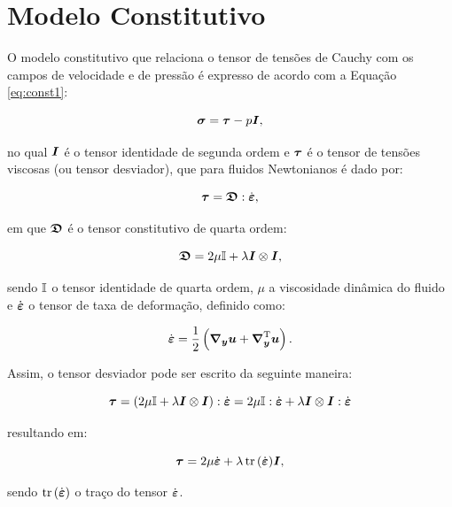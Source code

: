 \section{Modelo Constitutivo} \label{MC}

O modelo constitutivo que relaciona o tensor de tensões de Cauchy com os campos de velocidade e de pressão é expresso de acordo com a Equação \eqref{eq:const1}:

\begin{equation}
    \boldsymbol{\sigma}=\boldsymbol{\tau}-p\boldsymbol{I}\text{,}\label{eq:const1}
\end{equation}

\noindent no qual $\boldsymbol{I}$ é o tensor identidade de segunda ordem e $\boldsymbol{\tau}$ é o tensor de tensões viscosas (ou tensor desviador), que para fluidos Newtonianos é dado por:

\begin{equation}
    \boldsymbol{\tau}=\boldsymbol{\mathfrak{D}}:\dot{\boldsymbol{\varepsilon}}\text{,}
\end{equation}

\noindent em que $\boldsymbol{\mathfrak{D}}$ é o tensor constitutivo de quarta ordem:

\begin{equation}
    \boldsymbol{\mathfrak{D}}=2\mu\boldsymbol{\mathbb{I}}+\lambda\boldsymbol{I}\otimes\boldsymbol{I}\text{,}
\end{equation}

\noindent sendo $\boldsymbol{\mathbb{I}}$ o tensor identidade de quarta ordem, $\mu$ a viscosidade dinâmica do fluido e $\dot{\boldsymbol{\varepsilon}}$ o tensor de taxa de deformação, definido como:

\begin{equation}
    \dot{\boldsymbol{\varepsilon}}=\frac{1}{2}\left({\boldsymbol{\nabla_y}\boldsymbol{u}+\boldsymbol{\nabla}^{\mathrm{T}}_{\boldsymbol{y}}\boldsymbol{u}}\right)\text{.}\label{eq:deftax1}
\end{equation}

Assim, o tensor desviador pode ser escrito da seguinte maneira:

\[
    \boldsymbol{\tau}=(2\mu\boldsymbol{\mathbb{I}}+\lambda\boldsymbol{I}\otimes\boldsymbol{I}):\dot{\boldsymbol{\varepsilon}}=2\mu\boldsymbol{\mathbb{I}}:\dot{\boldsymbol{\varepsilon}}+\lambda\boldsymbol{I}\otimes\boldsymbol{I}:\dot{\boldsymbol{\varepsilon}}
\]

\noindent resultando em:

\begin{equation}
    \boldsymbol{\tau}=2\mu\dot{\boldsymbol{\varepsilon}}+\lambda\mathop{\mathrm{tr}}\nolimits{(\dot{\boldsymbol{\varepsilon}})}\boldsymbol{I}\text{,}
\end{equation}

\noindent sendo $\mathop{\mathrm{tr}}\nolimits{(\dot{\boldsymbol{\varepsilon}})}$ o traço do tensor $\dot{\boldsymbol{\varepsilon}}$.

